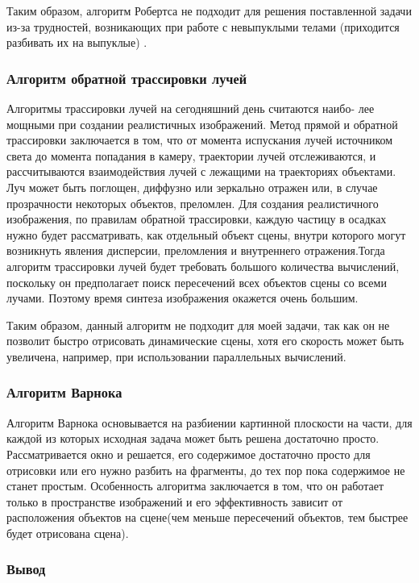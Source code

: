 Таким образом, алгоритм Робертса не подходит для решения поставленной задачи из-за трудностей, возникающих при работе с невыпуклыми телами (приходится разбивать их на выпуклые) \cite{robert}.

\subsubsection{Алгоритм обратной трассировки лучей}

Алгоритмы трассировки лучей на сегодняшний день считаются наибо-
лее мощными при создании реалистичных изображений.
Метод прямой и обратной трассировки \cite{ray} заключается в том, что от момента испускания лучей
источником света до момента попадания в камеру, траектории лучей отслеживаются, и рассчитываются
взаимодействия лучей с лежащими на траекториях объектами. Луч может быть поглощен, диффузно или
зеркально отражен или, в случае прозрачности некоторых объектов, преломлен.
Для создания реалистичного изображения, по правилам обратной
трассировки, каждую частицу в осадках нужно будет
рассматривать, как отдельный объект сцены, внутри которого могут возникнуть
явления дисперсии, преломления и внутреннего отражения.Тогда алгоритм трассировки лучей будет требовать большого количества вычислений, поскольку он
предполагает поиск пересечений всех объектов сцены со всеми лучами. Поэтому время синтеза изображения окажется очень большим.

Таким образом, данный алгоритм не подходит для моей задачи, так как он не позволит быстро отрисовать динамические сцены, хотя его скорость может быть увеличена, например, при использовании параллельных вычислений.

\subsubsection{Алгоритм Варнока}

Алгоритм Варнока основывается на разбиении картинной плоскости на части, для каждой из которых
исходная задача может быть решена достаточно просто. Рассматривается окно и решается, его содержимое достаточно просто для отрисовки или его нужно разбить на фрагменты, до тех пор пока содержимое не станет простым. Особенность алгоритма заключается в том, что он работает только в пространстве изображений и его эффективность зависит от расположения объектов на сцене(чем меньше пересечений объектов, тем быстрее будет отрисована сцена).

\subsubsection{Вывод}

